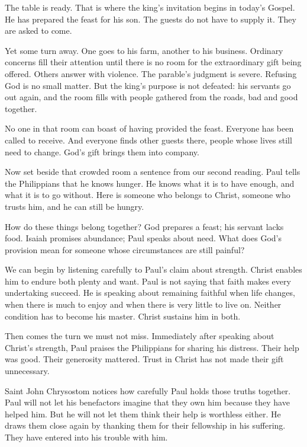 The table is ready. That is where the king's invitation begins in today's Gospel. He has prepared the feast for his son. The guests do not have to supply it. They are asked to come.

Yet some turn away. One goes to his farm, another to his business. Ordinary concerns fill their attention until there is no room for the extraordinary gift being offered. Others answer with violence. The parable's judgment is severe. Refusing God is no small matter. But the king's purpose is not defeated: his servants go out again, and the room fills with people gathered from the roads, bad and good together.

No one in that room can boast of having provided the feast. Everyone has been called to receive. And everyone finds other guests there, people whose lives still need to change. God's gift brings them into company.

Now set beside that crowded room a sentence from our second reading. Paul tells the Philippians that he knows hunger. He knows what it is to have enough, and what it is to go without. Here is someone who belongs to Christ, someone who trusts him, and he can still be hungry.

How do these things belong together? God prepares a feast; his servant lacks food. Isaiah promises abundance; Paul speaks about need. What does God's provision mean for someone whose circumstances are still painful?

We can begin by listening carefully to Paul's claim about strength. Christ enables him to endure both plenty and want. Paul is not saying that faith makes every undertaking succeed. He is speaking about remaining faithful when life changes, when there is much to enjoy and when there is very little to live on. Neither condition has to become his master. Christ sustains him in both.

Then comes the turn we must not miss. Immediately after speaking about Christ's strength, Paul praises the Philippians for sharing his distress. Their help was good. Their generosity mattered. Trust in Christ has not made their gift unnecessary.

Saint John Chrysostom notices how carefully Paul holds those truths together. Paul will not let his benefactors imagine that they own him because they have helped him. But he will not let them think their help is worthless either. He draws them close again by thanking them for their fellowship in his suffering. They have entered into his trouble with him.

